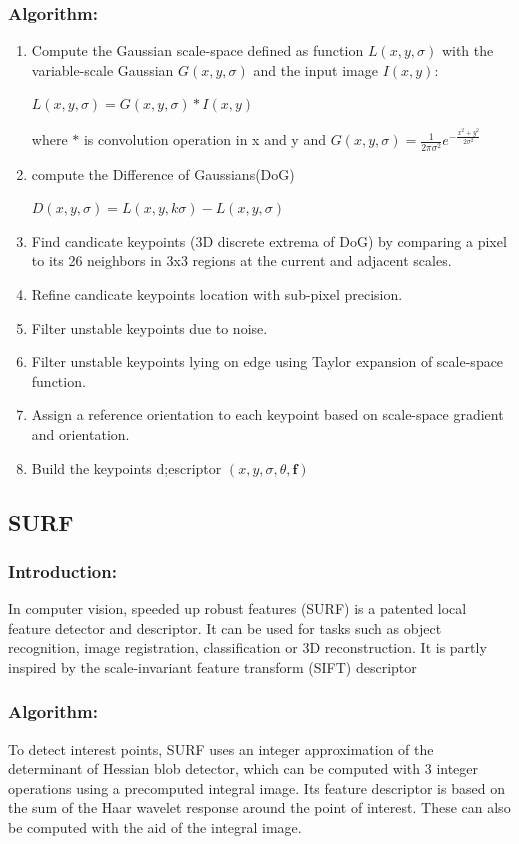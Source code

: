 \subsubsection{Algorithm:}
\begin{enumerate}
\item Compute the Gaussian scale-space defined as function $L(x,y,\sigma)$ with the variable-scale Gaussian $G(x,y,\sigma)$ and the input image $I(x,y)$: 
\begin{center}
$
	L(x,y,\sigma) = G(x,y,\sigma) * I(x,y)
$
\end{center}
where $*$ is convolution operation in x and y and $G(x,y,\sigma) = \frac{1}{2\pi \sigma^2}e^{-\frac{x^2+y^2}{2\sigma^2}} $
\item compute the Difference of Gaussians(DoG)
\begin{center}
$
	D(x,y,\sigma) = L(x,y,k\sigma) - L(x,y,\sigma)
$
\end{center}
\item Find candicate keypoints (3D discrete extrema of DoG) by comparing a pixel to its 26 neighbors in 3x3 regions at the current and adjacent scales.
\item Refine candicate keypoints location with sub-pixel precision.
\item Filter unstable keypoints due to noise.
\item Filter unstable keypoints lying on edge using Taylor expansion of scale-space function.
\item Assign a reference orientation to each keypoint based on scale-space gradient and orientation.
\item Build the keypoints d;escriptor ${(x,y,\sigma,\theta,\textbf{f})}$
\end{enumerate}
\subsection{SURF}
\subsubsection{Introduction:}
In computer vision, speeded up robust features (SURF) is a patented local feature detector and descriptor. It can be used for tasks such as object recognition, image registration, classification or 3D reconstruction. It is partly inspired by the scale-invariant feature transform (SIFT) descriptor
\subsubsection{Algorithm:}
To detect interest points, SURF uses an integer approximation of the determinant of Hessian blob detector, which can be computed with 3 integer operations using a precomputed integral image. Its feature descriptor is based on the sum of the Haar wavelet response around the point of interest. These can also be computed with the aid of the integral image.

